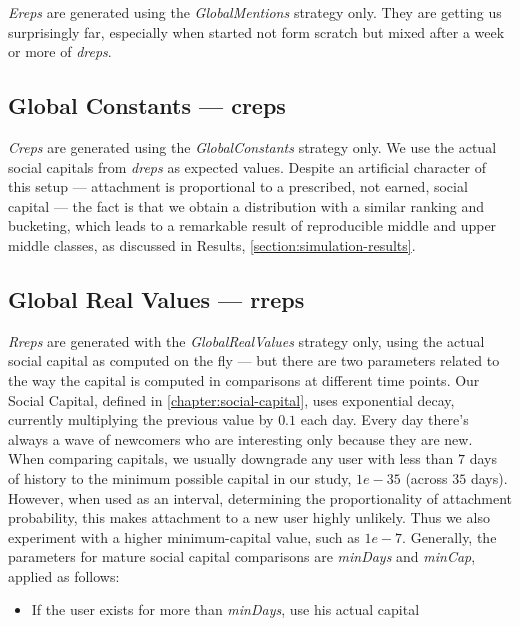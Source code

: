 \documentclass[10pt,oneside]{memoir}
\begin{document}
\begin{Spacing}{2}
{\itshape Ereps} are generated using the {\itshape GlobalMentions} strategy only.  They are getting us surprisingly far, especially when started not form scratch but mixed after a week or more of {\itshape dreps}.


\subsection{Global Constants --- creps}
\label{globalconstantscreps}

{\itshape Creps} are generated using the {\itshape GlobalConstants} strategy only.  We use the actual social capitals from {\itshape dreps} as expected values.  Despite an artificial character of this setup --- attachment is proportional to a prescribed, not earned, social capital --- the fact is that we obtain a distribution with a similar ranking and bucketing, which leads to a remarkable result of reproducible middle and upper middle classes, as discussed in Results, \ref{section:simulation-results}.


\subsection{Global Real Values --- rreps}
\label{globalrealvaluesrreps}

{\itshape Rreps} are generated with the {\itshape GlobalRealValues} strategy only, using the actual social capital as computed on the fly --- but there are two parameters related to the way the capital is computed in comparisons at different time points.  Our Social Capital, defined in \ref{chapter:social-capital}, uses exponential decay, currently multiplying the previous value by $0.1$ each day.  Every day there's always a wave of newcomers who are interesting only because they are new.  When comparing capitals, we usually downgrade any user with less than $7$ days of history to the minimum possible capital in our study, $1e-35$ (across $35$ days).  However, when used as an interval, determining the proportionality of attachment probability, this makes attachment to a new user highly unlikely.  Thus we also experiment with a higher minimum-capital value, such as $1e-7$.  Generally, the parameters for mature social capital comparisons are {\itshape minDays} and {\itshape minCap}, applied as follows:


\begin{itemize}


\item If the user exists for more than {\itshape minDays}, use his actual capital


\end{itemize}
\end{Spacing}
\end{document}
